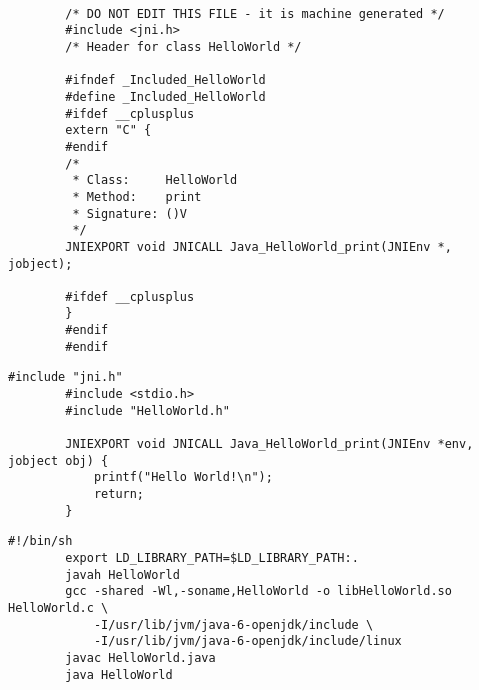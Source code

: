 	\begin{lstlisting}[caption=HelloWorld.h., label=list:helloWorldH]
	
		/* DO NOT EDIT THIS FILE - it is machine generated */
		#include <jni.h>
		/* Header for class HelloWorld */
		 
		#ifndef _Included_HelloWorld
		#define _Included_HelloWorld
		#ifdef __cplusplus
		extern "C" {
		#endif
		/*
		 * Class:     HelloWorld
		 * Method:    print
		 * Signature: ()V
		 */
		JNIEXPORT void JNICALL Java_HelloWorld_print(JNIEnv *, jobject);
		 
		#ifdef __cplusplus
		}
		#endif
		#endif
	\end{lstlisting}
		
	\begin{lstlisting}[caption=HelloWorld.c., label=list:helloWorldC]
		#include "jni.h"
		#include <stdio.h>
		#include "HelloWorld.h"
		 
		JNIEXPORT void JNICALL Java_HelloWorld_print(JNIEnv *env, jobject obj) {
		    printf("Hello World!\n");
		    return;
		}
	\end{lstlisting}
	
	\begin{lstlisting}[caption=make.sh., label=list:make]
		#!/bin/sh
		export LD_LIBRARY_PATH=$LD_LIBRARY_PATH:.
		javah HelloWorld
		gcc -shared -Wl,-soname,HelloWorld -o libHelloWorld.so HelloWorld.c \
			-I/usr/lib/jvm/java-6-openjdk/include \
			-I/usr/lib/jvm/java-6-openjdk/include/linux
		javac HelloWorld.java
		java HelloWorld
	\end{lstlisting}

